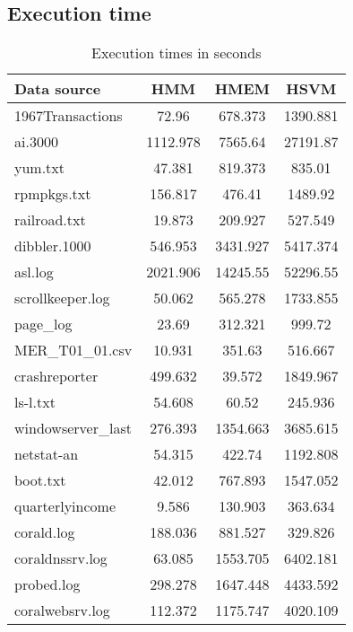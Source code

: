 \subsection{Execution time}
\begin{table}[th]
\begin{center}
\begin{tabular}{|l||c|c|c|}\hline
Data source & HMM & HMEM & HSVM \\ \hline 
1967Transactions & 72.96 & 678.373 & 1390.881   \\\hline 
ai.3000 & 1112.978 & 7565.64 & 27191.87 \\ \hline
yum.txt & 47.381 &  819.373 & 835.01\\ \hline
rpmpkgs.txt & 156.817 & 476.41 & 1489.92\\ \hline
railroad.txt & 19.873 & 209.927 & 527.549  \\ \hline
dibbler.1000 & 546.953 & 3431.927 & 5417.374   \\ \hline
asl.log & 2021.906 & 14245.55 & 52296.55 \\ \hline
scrollkeeper.log  &  50.062 & 565.278 & 1733.855 \\ \hline
page\_log  & 23.69 & 312.321 & 999.72 \\ \hline
MER\_T01\_01.csv & 10.931 & 351.63 & 516.667 \\ \hline
crashreporter & 499.632 & 39.572 & 1849.967 \\ \hline
ls-l.txt & 54.608 & 60.52 & 245.936 \\ \hline
windowserver\_last & 276.393 & 1354.663 & 3685.615 \\ \hline
netstat-an & 54.315 & 422.74 & 1192.808 \\ \hline
boot.txt & 42.012 &  767.893 & 1547.052 \\ \hline
quarterlyincome & 9.586 & 130.903 & 363.634   \\ \hline
corald.log & 188.036 &  881.527 & 329.826 \\ \hline
coraldnssrv.log  & 63.085 &  1553.705 & 6402.181\\ \hline
probed.log & 298.278 & 1647.448 & 4433.592 \\ \hline
coralwebsrv.log & 112.372 & 1175.747 & 4020.109 \\\hline
\end{tabular}
\caption{Execution times in seconds}
\label{tab:time}
\end{center}
\end{table}


